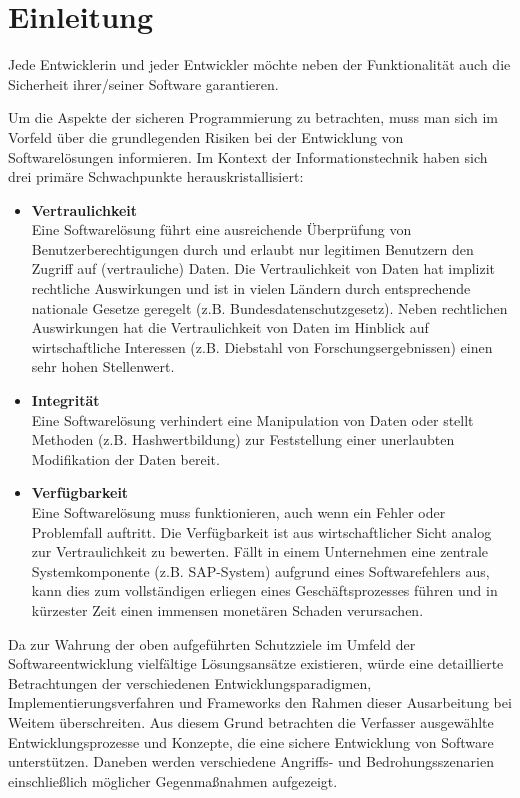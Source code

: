 \section{Einleitung}\label{einleitung}

Jede Entwicklerin und jeder Entwickler möchte neben der Funktionalität 
auch die Sicherheit ihrer/seiner Software garantieren.

Um die Aspekte der sicheren Programmierung zu betrachten, 
muss man sich im Vorfeld über die grundlegenden Risiken bei der 
Entwicklung von Softwarelösungen informieren.
Im Kontext der Informationstechnik haben sich drei primäre Schwachpunkte
herauskristallisiert:

\begin{itemize}
      \item\textbf{Vertraulichkeit}\\
 	   Eine Softwarelösung führt eine ausreichende Überprüfung von 
 	   Benutzerberechtigungen durch und erlaubt nur legitimen Benutzern 
 	   den Zugriff auf (vertrauliche) Daten. 
 	   Die Vertraulichkeit von Daten hat implizit rechtliche Auswirkungen 
 	   und ist in vielen Ländern durch entsprechende nationale Gesetze 
 	   geregelt (z.B. Bundesdatenschutzgesetz). Neben rechtlichen 
 	   Auswirkungen hat die Vertraulichkeit von Daten im Hinblick auf 
 	   wirtschaftliche Interessen (z.B. Diebstahl von Forschungsergebnissen) 
 	   einen sehr hohen Stellenwert.
	  
	  \item\textbf{Integrität}\\
	   Eine Softwarelösung verhindert eine Manipulation von Daten oder 
	   stellt Methoden (z.B. Hashwertbildung) zur Feststellung einer 
	   unerlaubten Modifikation der Daten bereit.
	  
	  \item\textbf{Verfügbarkeit} \\
	   Eine Softwarelösung muss funktionieren, auch wenn ein Fehler 
	   oder Problemfall auftritt. Die Verfügbarkeit ist aus wirtschaftlicher 
	   Sicht analog zur Vertraulichkeit zu bewerten. Fällt in einem 
	   Unternehmen eine zentrale Systemkomponente (z.B. SAP-System) 
	   aufgrund eines Softwarefehlers aus, kann dies zum vollständigen 
	   erliegen eines Geschäftsprozesses führen und in kürzester Zeit 
	   einen immensen monetären Schaden verursachen.
\end{itemize}

Da zur Wahrung der oben aufgeführten Schutzziele im Umfeld der 
Softwareentwicklung vielfältige Lösungsansätze existieren, würde eine 
detaillierte Betrachtungen der verschiedenen Entwicklungsparadigmen, 
Implementierungsverfahren und Frameworks den Rahmen dieser Ausarbeitung 
bei Weitem überschreiten. Aus diesem Grund betrachten die Verfasser 
ausgewählte Entwicklungsprozesse und Konzepte, die eine sichere 
Entwicklung von Software unterstützen. Daneben werden verschiedene 
Angriffs- und Bedrohungsszenarien einschließlich möglicher 
Gegenmaßnahmen aufgezeigt.


